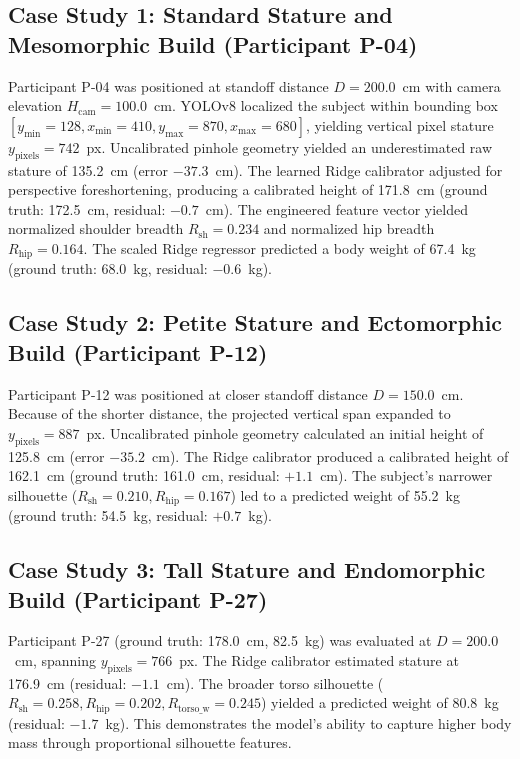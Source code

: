 \documentclass[12pt,a4paper,oneside]{report}
\begin{document}
\subsection{Case Study 1: Standard Stature and Mesomorphic Build (Participant P-04)}
Participant P-04 was positioned at standoff distance $D = 200.0$~cm with camera elevation $H_{\text{cam}} = 100.0$~cm. YOLOv8 localized the subject within bounding box $[y_{\min}=128, x_{\min}=410, y_{\max}=870, x_{\max}=680]$, yielding vertical pixel stature $y_{\text{pixels}} = 742$~px. Uncalibrated pinhole geometry yielded an underestimated raw stature of 135.2~cm (error $-37.3$~cm). The learned Ridge calibrator adjusted for perspective foreshortening, producing a calibrated height of 171.8~cm (ground truth: 172.5~cm, residual: $-0.7$~cm). The engineered feature vector yielded normalized shoulder breadth $R_{\text{sh}} = 0.234$ and normalized hip breadth $R_{\text{hip}} = 0.164$. The scaled Ridge regressor predicted a body weight of 67.4~kg (ground truth: 68.0~kg, residual: $-0.6$~kg).

\subsection{Case Study 2: Petite Stature and Ectomorphic Build (Participant P-12)}
Participant P-12 was positioned at closer standoff distance $D = 150.0$~cm. Because of the shorter distance, the projected vertical span expanded to $y_{\text{pixels}} = 887$~px. Uncalibrated pinhole geometry calculated an initial height of 125.8~cm (error $-35.2$~cm). The Ridge calibrator produced a calibrated height of 162.1~cm (ground truth: 161.0~cm, residual: $+1.1$~cm). The subject's narrower silhouette ($R_{\text{sh}} = 0.210, R_{\text{hip}} = 0.167$) led to a predicted weight of 55.2~kg (ground truth: 54.5~kg, residual: $+0.7$~kg).

\subsection{Case Study 3: Tall Stature and Endomorphic Build (Participant P-27)}
Participant P-27 (ground truth: 178.0~cm, 82.5~kg) was evaluated at $D = 200.0$~cm, spanning $y_{\text{pixels}} = 766$~px. The Ridge calibrator estimated stature at 176.9~cm (residual: $-1.1$~cm). The broader torso silhouette ($R_{\text{sh}} = 0.258, R_{\text{hip}} = 0.202, R_{\text{torso\_w}} = 0.245$) yielded a predicted weight of 80.8~kg (residual: $-1.7$~kg). This demonstrates the model's ability to capture higher body mass through proportional silhouette features.
\end{document}
